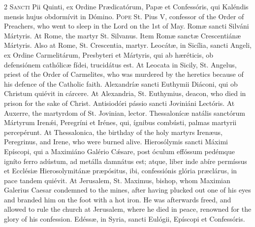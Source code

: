 \begin{paracol}{2}
\lettrine[lines=2]{S}{ancti} Pii Quinti, ex 
 Ordine Prædicatórum, Papæ et Confessóris, qui Kaléndis mensis hujus 
 obdormívit in Dómino.
\switchcolumn
{}
\lettrine[lines=2]{P}{ope} St. Pius V, confessor of the 
 Order of Preachers, who went to sleep in the Lord on the 1st of May.
\switchcolumn*
{}
Romæ sancti Silváni 
 Mártyris.
\switchcolumn
{}
At Rome, the martyr St. Silvanus.
\switchcolumn*
{}
Item Romæ sanctæ 
 Crescentiánæ Mártyris.
\switchcolumn
{}
Also at Rome, St. Crescentia, 
 martyr.
\switchcolumn*
{}
Leocátæ, in Sicília, 
 sancti Angeli, ex Ordine Carmelitárum, Presbyteri et Mártyris, qui ab 
 hæréticis, ob defensiónem cathólicæ fídei, trucidátus est.
\switchcolumn
{}
At Leocata in Sicily, St. Angelus, 
 priest of the Order of Carmelites, who was murdered by the heretics because 
 of his defence of the Catholic faith.
\switchcolumn*
{}
Alexandríæ sancti 
 Euthymii Diáconi, qui ob Christum quiévit in cárcere.
\switchcolumn
{}
At Alexandria, St. Euthymius, 
 deacon, who died in prison for the sake of Christ.
\switchcolumn*
{}
Antisiodóri pássio 
 sancti Joviniáni Lectóris.
\switchcolumn
{}
At Auxerre, the martyrdom of St. 
 Jovinian, lector.
\switchcolumn*
{}
Thessalonícæ natális 
 sanctórum Mártyrum Irenǽi, Peregríni et Irénes, qui, 
 ígnibus combústi, 
 palmas martyrii percepérunt.
\switchcolumn
{}
At Thessalonica, the birthday of 
 the holy martyrs Irenæus, Peregrinus, and Irene, who were burned alive.
\switchcolumn*
{}
Hierosólymis sancti 
 Máximi Epíscopi, qui a Maximiáno Galério Cǽsare, post óculum effóssum 
 pedémque igníto ferro adústum, ad metálla damnátus est; atque, liber inde 
 abíre permíssus et Ecclésiæ Hierosolymitánæ præpósitus, ibi, confessiónis 
 glória præclárus, in pace tandem quiévit.
\switchcolumn
{}
At Jerusalem, St. Maximus, bishop, 
 whom Maximian Galerius Caesar condemned to the mines, after having plucked 
 out one of his eyes and branded him on the foot with a hot iron. He 
 was afterwards freed, and allowed to rule the church at Jerusalem, where he 
 died in peace, renowned for the glory of his confession.
\switchcolumn*
{}
Edéssæ, in Syria, 
 sancti Eulógii, Epíscopi et Confessóris.
\switchcolumn
{}

\end{paracol}
